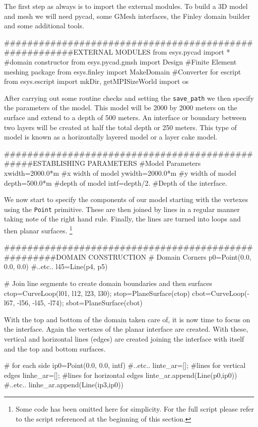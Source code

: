 The first step as always is to import the external modules. To build a 3D model
and mesh we will need pycad, some GMesh interfaces, the Finley domain builder
and some additional tools.
\begin{python}
#######################################################EXTERNAL MODULES
from esys.pycad import * #domain constructor
from esys.pycad.gmsh import Design #Finite Element meshing package
from esys.finley import MakeDomain #Converter for escript
from esys.escript import mkDir, getMPISizeWorld
import os
\end{python}
After carrying out some routine checks and setting the \verb!save_path! we then
specify the parameters of the model. This model will be 2000 by 2000 meters on
the surface and extend to a depth of 500 meters. An interface or boundary
between two layers will be created at half the total depth or 250 meters. This
type of model is known as a horizontally layered model or a layer cake model. 
\begin{python}
################################################ESTABLISHING PARAMETERS
#Model Parameters
xwidth=2000.0*m   #x width of model
ywidth=2000.0*m   #y width of model
depth=500.0*m   #depth of model
intf=depth/2.   #Depth of the interface.
\end{python}
We now start to specify the components of our model starting with the vertexes
using the \verb!Point! primitive. These are then joined by lines in a regular
manner taking note of the right hand rule. Finally, the lines are turned into
loops and then planar surfaces.
\footnote{Some code has been omitted here for
simplicity. For the full script please refer to the script referenced at the beginning of
this section.}
\begin{python}
####################################################DOMAIN CONSTRUCTION
# Domain Corners
p0=Point(0.0,    0.0,      0.0)
#..etc..
l45=Line(p4, p5)

# Join line segments to create domain boundaries and then surfaces
ctop=CurveLoop(l01, l12, l23, l30);     stop=PlaneSurface(ctop)
cbot=CurveLoop(-l67, -l56, -l45, -l74); sbot=PlaneSurface(cbot)
\end{python}
With the top and bottom of the domain taken care of, it is now time to focus on
the interface. Again the vertexes of the planar interface are created. With
these, vertical and horizontal lines (edges) are created joining the interface
with itself and the top and bottom surfaces. 
\begin{python}
# for each side
ip0=Point(0.0,    0.0,      intf)
#..etc..
linte_ar=[]; #lines for vertical edges
linhe_ar=[]; #lines for horizontal edges
linte_ar.append(Line(p0,ip0))
#..etc..
linhe_ar.append(Line(ip3,ip0))
\end{python}
